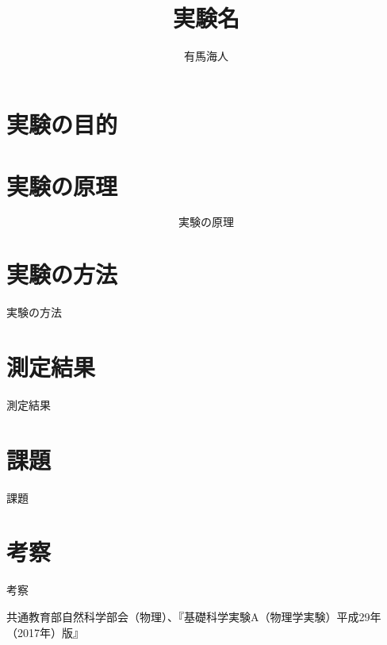 \documentclass{jsarticle}
\begin{document}
\title{実験名}
\author{有馬海人}
\maketitle

\section{実験の目的}


\section{実験の原理}

\begin{equation}
    実験の原理
\end{equation}

\section{実験の方法}

実験の方法

\section{測定結果}

測定結果

\section{課題}

課題

\section{考察}

考察






\begin{thebibliography}{99}
     共通教育部自然科学部会（物理）、『基礎科学実験A（物理学実験）平成29年（2017年）版』
\end{thebibliography}
\end{document}
